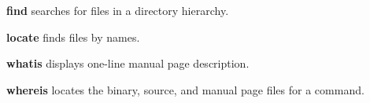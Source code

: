 \begin{enumx}
\item [\cmd] \textbf{find} searches for files in a directory hierarchy.
\item [\cmd] \textbf{locate} finds files by names.
\item [\cmd] \textbf{whatis} displays one-line manual page description.
\item [\cmd] \textbf{whereis} locates the binary, source, 
and manual page files for a command.
\end{enumx}

